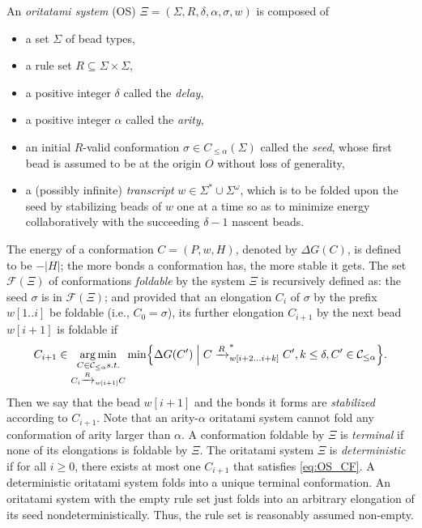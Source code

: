 \documentclass[runningheads]{llncs}
\DeclareMathOperator*{\argmin}{arg\,min}
\begin{document}
An \textit{oritatami system} (OS) $\Xi = (\Sigma, R, \delta, \alpha, \sigma, w)$ is composed of
\begin{itemize}
\item a set $\Sigma$ of bead types, 
\item a rule set $R \subseteq \Sigma \times \Sigma$, 
\item a positive integer $\delta$ called the \textit{delay}, 
\item a positive integer $\alpha$ called the \textit{arity}, 
\item an initial $R$-valid conformation $\sigma \in C_{\le \alpha}(\Sigma)$ called the \textit{seed}, whose first bead is assumed to be at the origin $O$ without loss of generality, 
\item a (possibly infinite) \textit{transcript} $w \in \Sigma^* \cup \Sigma^\omega$, which is to be folded upon the seed by stabilizing beads of $w$ one at a time so as to minimize energy collaboratively with the succeeding $\delta{-}1$ nascent beads. 
\end{itemize}
The energy of a conformation $C = (P, w, H)$, denoted by $\Delta G(C)$, is defined to be ${-}|H|$; the more bonds a conformation has, the more stable it gets. 
The set $\mathcal{F}(\Xi)$ of conformations \textit{foldable} by the system $\Xi$ is recursively defined as: the seed $\sigma$ is in $\mathcal{F}(\Xi)$; and provided that an elongation $C_i$ of $\sigma$ by the prefix $w[1..i]$ be foldable (i.e., $C_0 = \sigma$), its further elongation $C_{i+1}$ by the next bead $w[i+1]$ is foldable if 
\begin{equation}\label{eq:OS_CF}
C_{i+1} \in \argmin_{
\substack{
C \in \mathcal{C}_{\le \alpha} s.t. \\
C_i \xrightarrow{R}_{w[i+1]}C \\
}
}
\min \Bigl\{ \Delta G(C') \Bigm|
C \xrightarrow{R}^*_{w[i+2...i+k]}C', k\le \delta, C' \in \mathcal{C}_{\le \alpha}
\Bigr\}.
\end{equation}
%
Then we say that the bead $w[i+1]$ and the bonds it forms are \textit{stabilized} according to $C_{i+1}$. 
Note that an arity-$\alpha$ oritatami system cannot fold any conformation of arity larger than $\alpha$. 
A conformation foldable by $\Xi$ is \textit{terminal} if none of its elongations is foldable by $\Xi$. 
The oritatami system $\Xi$ is \textit{deterministic} if for all $i \ge 0$, there exists at most one $C_{i+1}$ that satisfies \eqref{eq:OS_CF}. 
A deterministic oritatami system folds into a unique terminal conformation. 
An oritatami system with the empty rule set just folds into an arbitrary elongation of its seed nondeterministically. 
Thus, the rule set is reasonably assumed non-empty. 
\end{document}
